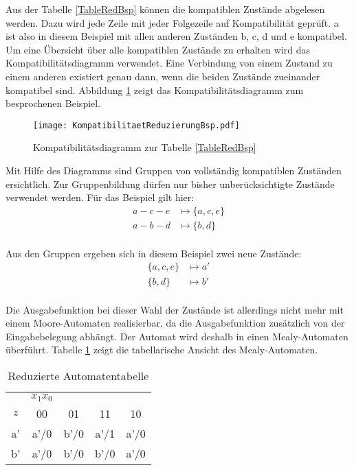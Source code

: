 Aus der Tabelle \ref{TableRedBsp} können die kompatiblen Zustände abgelesen werden. Dazu wird jede Zeile mit jeder Folgezeile auf Kompatibilität geprüft. a ist also in diesem Beispiel mit allen anderen Zuständen b, c, d und e kompatibel. Um eine Übersicht über alle kompatiblen Zustände zu erhalten wird das Kompatibilitätsdiagramm verwendet. Eine Verbindung von einem Zustand zu einem anderen existiert genau dann, wenn die beiden Zustände zueinander kompatibel sind. Abbildung \ref{KomRedBsp} zeigt das Kompatibilitätsdiagramm zum besprochenen Beispiel.

\begin{figure}[htp]
	\centering
	\texttt{[image: KompatibilitaetReduzierungBsp.pdf]}
	\caption{Kompatibilitätsdiagramm zur Tabelle \ref{TableRedBsp}}
	\label{KomRedBsp}
\end{figure}

Mit Hilfe des Diagramms sind Gruppen von vollständig kompatiblen Zuständen ersichtlich. Zur Gruppenbildung dürfen nur bisher unberücksichtigte Zustände verwendet werden. Für das Beispiel gilt hier:
\begin{align*}
	a-c-e &\mapsto \{a,c,e\} \\
	a-b-d &\mapsto \{b,d\} \\
\end{align*}

Aus den Gruppen ergeben sich in diesem Beispiel zwei neue Zustände:
\begin{align*}
	\{a,c,e\} &\mapsto a' \\
	\{b,d\} &\mapsto b' \\
\end{align*}

Die Ausgabefunktion bei dieser Wahl der Zustände ist allerdings nicht mehr mit einem Moore-Automaten realisierbar, da die Ausgabefunktion zusätzlich von der Eingabebelegung abhängt. Der Automat wird deshalb in einen Mealy-Automaten überführt. Tabelle \ref{TableRedBspRed} zeigt die tabellarische Ansicht des Mealy-Automaten.
\begin{table}[htp]
\centering
\begin{tabular}{c|cccc}
 & $x_1x_0$ \\
$z$ & 00 & 01 & 11 & 10\\ \hline
a' & a'/0 & b'/0 & a'/1 & a'/0\\
b' & a'/0 & b'/0 & b'/0 & a'/0\\
\end{tabular}
\caption{Reduzierte Automatentabelle}
\label{TableRedBspRed}
\end{table}



  

